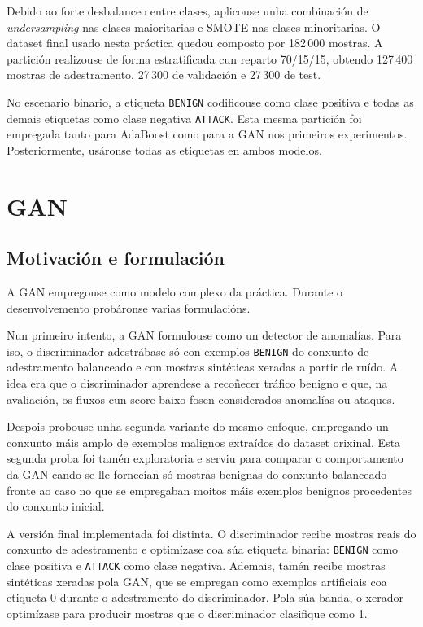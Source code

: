 \documentclass[12pt,a4paper]{article}
\begin{document}
Debido ao forte desbalanceo entre clases, aplicouse unha combinación de \emph{undersampling} nas clases maioritarias e SMOTE nas clases minoritarias. 
O dataset final usado nesta práctica quedou composto por 182\,000 mostras. A partición realizouse de forma estratificada cun reparto 70/15/15, obtendo 
127\,400 mostras de adestramento, 27\,300 de validación e 27\,300 de test.

No escenario binario, a etiqueta \texttt{BENIGN} codificouse como clase positiva e todas as demais etiquetas como clase negativa \texttt{ATTACK}. 
Esta mesma partición foi empregada tanto para AdaBoost como para a GAN nos primeiros experimentos. 
Posteriormente, usáronse todas as etiquetas en ambos modelos.


\section{GAN}

\subsection{Motivación e formulación}

A GAN empregouse como modelo complexo da práctica. Durante o desenvolvemento
probáronse varias formulacións.

Nun primeiro intento, a GAN formulouse como un detector de anomalías. Para iso,
o discriminador adestrábase só con exemplos \texttt{BENIGN} do conxunto de
adestramento balanceado e con mostras sintéticas xeradas a partir de ruído.
A idea era que o discriminador aprendese a recoñecer tráfico benigno e que,
na avaliación, os fluxos cun score baixo fosen considerados anomalías ou
ataques.

Despois probouse unha segunda variante do mesmo enfoque, empregando un
conxunto máis amplo de exemplos malignos extraídos do dataset orixinal.
Esta segunda proba foi tamén exploratoria e serviu para comparar o
comportamento da GAN cando se lle fornecían só mostras benignas do conxunto
balanceado fronte ao caso no que se empregaban moitos máis exemplos benignos
procedentes do conxunto inicial.

A versión final implementada foi distinta. O discriminador recibe mostras reais
do conxunto de adestramento e optimízase coa súa etiqueta binaria:
\texttt{BENIGN} como clase positiva e \texttt{ATTACK} como clase negativa.
Ademais, tamén recibe mostras sintéticas xeradas pola GAN, que se empregan
como exemplos artificiais coa etiqueta 0 durante o adestramento do
discriminador. Pola súa banda, o xerador optimízase para producir mostras que
o discriminador clasifique como 1.
\end{document}
